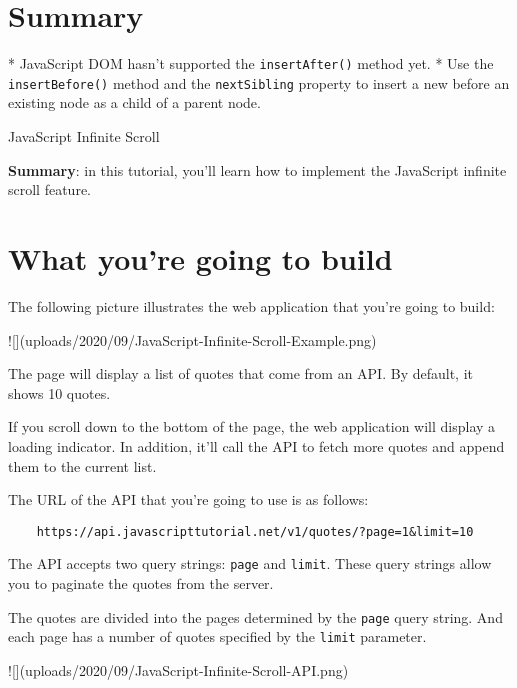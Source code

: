 \documentclass[11pt]{article}
\begin{document}
\section*{Summary}

* JavaScript DOM hasn't supported the \verb|insertAfter()| method yet.
* Use the \verb|insertBefore()| method and the \verb|nextSibling| property
to insert a new before an existing node as a child of a parent node.

{\huge JavaScript Infinite Scroll}

\begin{displayquote}
\textbf{Summary}: in this tutorial, you'll learn how to implement the
JavaScript infinite scroll feature.
\end{displayquote}

\section*{What you're going to build}

The following picture illustrates the web application that
you're going to build:

![](uploads/2020/09/JavaScript-Infinite-Scroll-Example.png)

\noindent
The page will display a list of quotes that come from an API.
By default, it shows 10 quotes.
\newline

\noindent
If you scroll down to the bottom of the page, the web application will
display a loading indicator. In addition, it'll call the API to fetch
more quotes and append them to the current list.
\newline

\noindent
The URL of the API that you're going to use is as follows:

\begin{lstlisting}
    https://api.javascripttutorial.net/v1/quotes/?page=1&limit=10
\end{lstlisting}

\noindent
The API accepts two query strings: \verb|page| and \verb|limit|. These query
strings allow you to paginate the quotes from the server.
\newline

\noindent
The quotes are divided into the pages determined by the \verb|page| query string.
And each page has a number of quotes specified by the \verb|limit| parameter.

![](uploads/2020/09/JavaScript-Infinite-Scroll-API.png)
\end{document}
